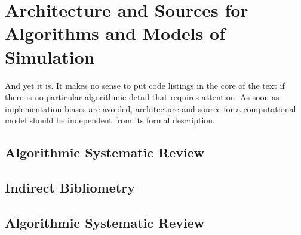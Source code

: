 


\chapter{Architecture and Sources for Algorithms and Models of Simulation} %

\label{app:code} %









And yet it is. It makes no sense to put code listings in the core of the text if there is no particular algorithmic detail that requires attention. As soon as implementation biases are avoided, architecture and source for a computational model should be independent from its formal description.



\newpage

\section{Algorithmic Systematic Review}





\newpage

\section{Indirect Bibliometry}






\newpage

\section{Algorithmic Systematic Review}



